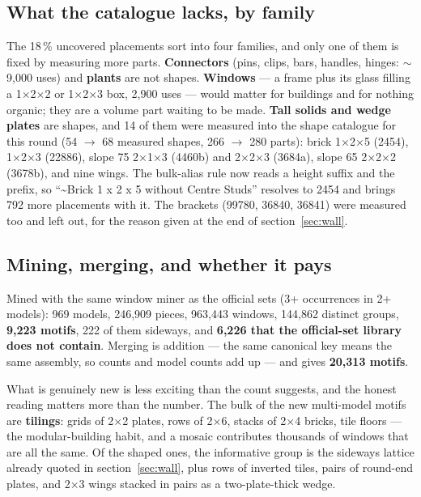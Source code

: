 \subsection{What the catalogue lacks, by family}
The 18\,\% uncovered placements sort into four families, and only one of them is fixed by measuring more parts.
\textbf{Connectors} (pins, clips, bars, handles, hinges: $\sim$9,000 uses) and \textbf{plants} are not shapes.
\textbf{Windows} --- a frame plus its glass filling a 1$\times$2$\times$2 or 1$\times$2$\times$3 box, 2,900 uses --- would matter for
buildings and for nothing organic; they are a volume part waiting to be made. \textbf{Tall solids and wedge plates} are shapes, and
14 of them were measured into the shape catalogue for this round (54 $\to$ 68 measured shapes, 266 $\to$ 280 parts): brick
1$\times$2$\times$5 (2454), 1$\times$2$\times$3 (22886), slope 75 2$\times$1$\times$3 (4460b) and 2$\times$2$\times$3 (3684a), slope
65 2$\times$2$\times$2 (3678b), and nine wings. The bulk-alias rule now reads a height suffix and the 
prefix, so ``\~{}Brick 1 x 2 x 5 without Centre Studs'' resolves to 2454 and brings 792 more placements with it. The brackets
(99780, 36840, 36841) were measured too and left out, for the reason given at the end of section~\ref{sec:wall}.

\subsection{Mining, merging, and whether it pays}
Mined with the same window miner as the official sets (3+ occurrences in 2+ models): 969 models, 246,909 pieces, 963,443 windows,
144,862 distinct groups, \textbf{9,223 motifs}, 222 of them sideways, and \textbf{6,226 that the official-set library does not
contain}. Merging is addition --- the same canonical key means the same assembly, so counts and model counts add up --- and gives
\textbf{20,313 motifs}.

What is genuinely new is less exciting than the count suggests, and the honest reading matters more than the number. The bulk of
the new multi-model motifs are \textbf{tilings}: grids of 2$\times$2 plates, rows of 2$\times$6, stacks of 2$\times$4 bricks, tile
floors --- the modular-building habit, and a mosaic contributes thousands of windows that are all the same. Of the shaped ones, the
informative group is the sideways lattice already quoted in section~\ref{sec:wall}, plus rows of inverted tiles, pairs of
round-end plates, and 2$\times$3 wings stacked in pairs as a two-plate-thick wedge.

